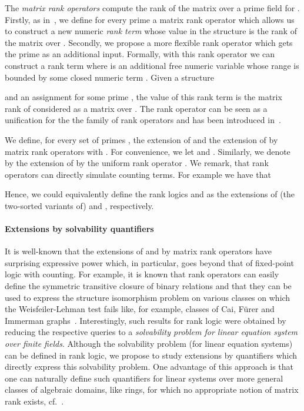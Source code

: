 \documentclass[a4paper,UKenglish]{lipics}
\theoremstyle{plain}
\begin{document}
The \emph{matrix rank operators} compute the rank of the matrix  
over a prime field  for .
Firstly, as in~\cite{DaGrHoLa09}, we define for every prime  a matrix rank 
operator  which allows us to construct a new numeric \emph{rank term}  whose value in the 
structure  is the rank of the matrix  over 
.
Secondly, we propose a more flexible rank operator  which gets the prime 
 as an additional input. Formally, with this rank operator  we can 
construct a rank term  where  is an additional free numeric variable 
whose range is bounded by some closed numeric term . Given a structure 
 
and an assignment  for some prime , the value of 
this rank term is the matrix rank of  considered as a 
matrix over .
The rank operator  can be seen as a unification for the 
the family of rank operators  and has been introduced 
in~\cite{Ho10, La11, Pa10}.

\smallskip
We define, for every set of primes , the extension 
 of  and the extension  of  by  
matrix rank operators  with . 
For convenience, we let  and .
Similarly, we denote by  the extension of  by the uniform rank 
operator . 
We remark, that rank operators can directly simulate counting terms. For 
example we have that 
 
Hence, we could equivalently define the rank logics  and  as the extensions of (the two-sorted variants of) 
 and , respectively.
\smallskip


\paragraph*{Extensions by solvability quantifiers}

It is well-known that the extensions of  and  by matrix rank 
operators have surprising expressive power which, in particular, goes beyond 
that of fixed-point logic with counting. 
For example, it is known that rank operators can easily define the 
symmetric transitive closure of binary relations and that they can be used 
to express the structure isomorphism problem on various classes on which
the Weisfeiler-Lehman test fails like, for example, classes of Cai, Fürer and 
Immerman graphs~\cite{CFI92, DaGrHoLa09}.
Interestingly, such results for rank logic were obtained by reducing the 
respective queries to a \emph{solvability problem for linear equation system 
over finite fields}.
Although the solvability problem (for linear equation systems) can 
be defined in rank logic, we propose to study extensions by 
quantifiers which directly express this solvability problem. One 
advantage of this approach is that one can naturally define such 
quantifiers for 
linear systems over more 
general classes of algebraic domains, like rings, for which no appropriate 
notion of matrix rank exists, cf.\ \cite{DaGrHoKoPa13}. 
\end{document}

